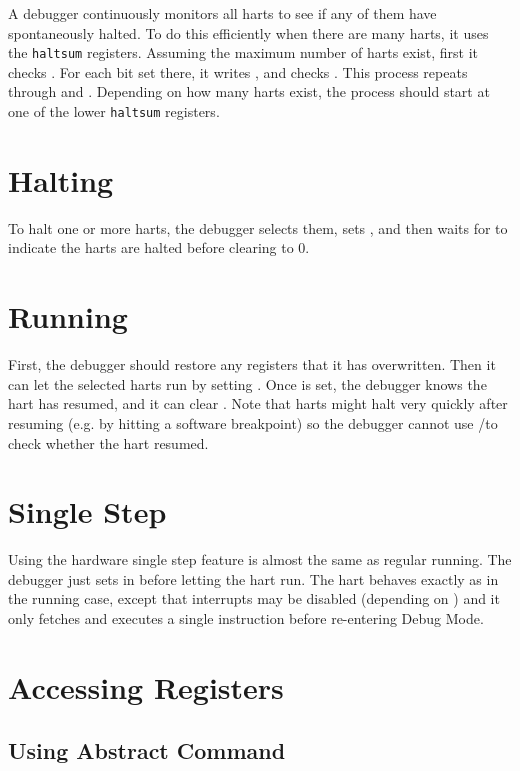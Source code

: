 A debugger continuously monitors all harts to see if any of them have
spontaneously halted. To do this efficiently when there are many harts, it uses
the {\tt haltsum} registers. Assuming the maximum number of harts exist, first
it checks \Rhaltsumthree. For each bit set there, it writes \Fhartsel, and
checks \Rhaltsumtwo. This process repeats through \Rhaltsumone and
\Rhaltsumzero. Depending on how many harts exist, the process should
start at one of the lower {\tt haltsum} registers.

\section{Halting} \label{deb:halt}

To halt one or more harts, the debugger selects them, sets \Fhaltreq, and then
waits for \Fallhalted to indicate the harts are halted before clearing
\Fhaltreq to 0.

\section{Running}

First, the debugger should restore any registers that it has overwritten.
Then it can let the selected harts run by setting \Fresumereq. Once
\Fallresumeack is set, the debugger knows the hart has resumed, and it can
clear \Fresumereq. Note that harts might halt very quickly after resuming (e.g.
by hitting a software breakpoint) so the debugger cannot use
\Fallhalted/\Fanyhalted to check whether the hart resumed.

\section{Single Step}

Using the hardware single step feature is almost the same as regular running.
The debugger just sets \Fstep in \Rdcsr before letting the hart run. The hart
behaves exactly as in the running case, except that interrupts may be disabled
(depending on \Fstepie) and it only fetches and executes a single instruction
before re-entering Debug Mode.

\section{Accessing Registers}

\subsection{Using Abstract Command} \label{deb:abstractreg}

